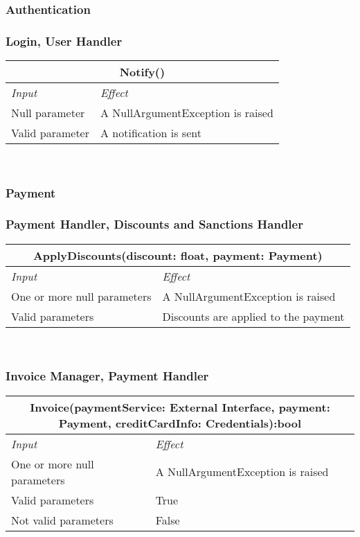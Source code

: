 	\label{sec: individual_steps_4}
	\subsubsection{Authentication}
		\subsubsection*{Login, User Handler }
			\begin{tabular}{ |l|l| }
				\hline
				\multicolumn{2}{|c|}{Notify()}\\
				\hline 
				\textit{Input}&\textit{Effect}\\ \hline
				Null parameter & A NullArgumentException is raised\\ \hline
				Valid parameter & A notification is sent \\ \hline
			\end{tabular}
			\\
	 \subsubsection{Payment}
		 \subsubsection*{Payment Handler, Discounts and Sanctions Handler }
			\begin{tabular}{ |l|l| }
				\hline
				\multicolumn{2}{|c|}{ApplyDiscounts(discount: float, payment: Payment)}\\
				\hline 
				\textit{Input}&\textit{Effect}\\ \hline
				One or more null parameters & A NullArgumentException is raised\\ \hline
				Valid parameters & Discounts are applied to the payment \\ \hline
			\end{tabular}
			\\
			
		\subsubsection*{Invoice Manager, Payment Handler}
			\begin{tabular}{ |l|l| }
				\hline
				\multicolumn{2}{|c|}{Invoice(paymentService: External Interface, payment: Payment, creditCardInfo: Credentials):bool}\\
				\hline 
				\textit{Input}&\textit{Effect}\\ \hline
				One or more null parameters & A NullArgumentException is raised\\ \hline
				Valid parameters & True \\ \hline
				Not valid parameters & False \\ \hline
			\end{tabular}
			\\
			
